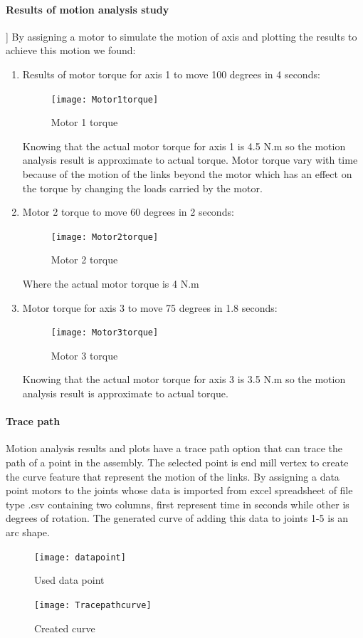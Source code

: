 \bigskip
\paragraph{Results of motion analysis study}] 
By assigning a motor to simulate the motion of axis and plotting the results to achieve this motion we found:
\begin{enumerate}
	\item Results of motor torque for axis 1 to move 100 degrees in 4 seconds:

	\begin{figure}[H]
		\centering
		\texttt{[image: Motor1torque]}
		\caption{Motor 1 torque}
	\end{figure}
	
	\smallskip
Knowing that the actual motor torque for axis 1 is 4.5 N.m so the motion analysis result is approximate to actual torque. 
\newline Motor torque vary with time because of the motion of the links beyond the motor which has an effect on the torque by changing the loads carried by the motor.
\smallskip
	\item Motor 2 torque to move 60 degrees in 2 seconds:
	\begin{figure}[H]
		\centering
		\texttt{[image: Motor2torque]}
		\caption{Motor 2 torque}
	\end{figure}
	
	Where the actual motor torque is 4 N.m

\smallskip
	\item Motor torque for axis 3 to move 75 degrees in 1.8 seconds:
	\begin{figure}[H]
		\centering
		\texttt{[image: Motor3torque]}
		\caption{Motor 3 torque}
	\end{figure}
	
	Knowing that the actual motor torque for axis 3 is 3.5 N.m so the motion analysis result is approximate to actual torque.
\end{enumerate}

\bigskip
\paragraph{Trace path}
Motion analysis results and plots have a trace path option that can trace the path of a point in the assembly. The selected point is end mill vertex to create the curve feature that represent the motion of the links.  By assigning a data point motors to the joints whose data is imported from excel spreadsheet of file type .csv containing two columns, first represent time in seconds while other is degrees of rotation. The generated curve of adding this data to joints 1-5 is an arc shape.

\begin{figure}[H]
	\centering
	\texttt{[image: datapoint]}
	\caption{Used data point}
\end{figure}

\begin{figure}[H]
	\centering
	\texttt{[image: Tracepathcurve]}
	\caption{Created curve}
\end{figure}

%
%    